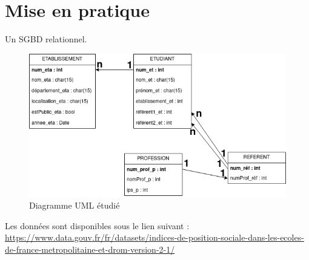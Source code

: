 \documentclass[10pt, a4paper]{article}
\begin{document}
\newpage
\section{Mise en pratique}



\begin{tcolorbox}[lefttitle=1cm, colframe=gray!75!black, colback=white, title=\textbf{ENTREE : un SGBD relationnel}]
Un SGBD relationnel.
\begin{figure}[H]
    \centering
    \includegraphics[scale=0.5]{chapitre1/figures/sae1UML.png}
    \caption{Diagramme UML étudié}
    \label{fig:enter-label}
\end{figure}

Les données sont disponibles sous le lien suivant : \url{https://www.data.gouv.fr/fr/datasets/indices-de-position-sociale-dans-les-ecoles-de-france-metropolitaine-et-drom-version-2-1/}

\end{tcolorbox}
\end{document}
